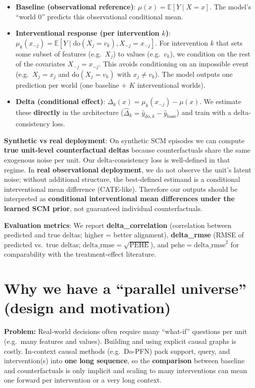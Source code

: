 \documentclass[12pt]{article}
\begin{document}
\begin{itemize}
    \item \textbf{Baseline (observational reference)}: $\mu(x) = \mathbb{E}[Y \mid X = x]$. The model's ``world 0'' predicts this observational conditional mean.

    \item \textbf{Interventional response (per intervention $k$)}: $\mu_k(x_{-j}) = \mathbb{E}[Y \mid \text{do}(X_j = v_k), X_{-j} = x_{-j}]$. For intervention $k$ that sets some subset of features (e.g.\ $X_j$) to values (e.g.\ $v_k$), we condition on the rest of the covariates $X_{-j} = x_{-j}$. This avoids conditioning on an impossible event (e.g.\ $X_j = x_j$ and $\text{do}(X_j = v_k)$ with $x_j \neq v_k$). The model outputs one prediction per world (one baseline $+$ $K$ interventional worlds).

    \item \textbf{Delta (conditional effect)}: $\Delta_k(x) = \mu_k(x_{-j}) - \mu(x)$. We estimate these \textbf{directly} in the architecture ($\hat{\Delta}_k = \hat{y}_{\text{do},k} - \hat{y}_{\text{base}}$) and train with a delta-consistency loss.
\end{itemize}

\textbf{Synthetic vs real deployment}: On synthetic SCM episodes we can compute \textbf{true unit-level counterfactual deltas} because counterfactuals share the same exogenous noise per unit. Our delta-consistency loss is well-defined in that regime. In \textbf{real observational deployment}, we do not observe the unit's latent noise; without additional structure, the best-defined estimand is a conditional interventional mean difference (CATE-like). Therefore our outputs should be interpreted as \textbf{conditional interventional mean differences under the learned SCM prior}, not guaranteed individual counterfactuals.

\textbf{Evaluation metrics}: We report \textbf{delta\_correlation} (correlation between predicted and true deltas; higher = better alignment), \textbf{delta\_rmse} (RMSE of predicted vs.\ true deltas; $\text{delta\_rmse} = \sqrt{\text{PEHE}}$), and $\text{pehe} = \text{delta\_rmse}^2$ for comparability with the treatment-effect literature.

\section{Why we have a ``parallel universe'' (design and motivation)}

\textbf{Problem:} Real-world decisions often require many ``what-if'' questions per unit (e.g.\ many features and values). Building and using explicit causal graphs is costly. In-context causal methods (e.g.\ Do-PFN) pack support, query, and intervention(s) into \textbf{one long sequence}, so the \textbf{comparison} between baseline and counterfactuals is only implicit and scaling to many interventions can mean one forward per intervention or a very long context.
\end{document}

